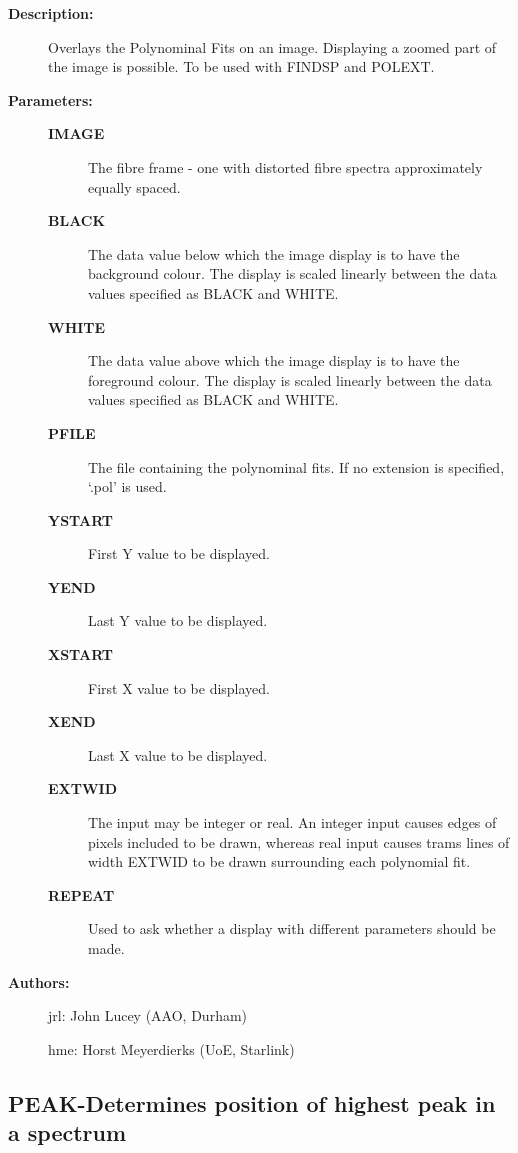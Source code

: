\begin{description}
\begin{description}
\item [\textbf{Description:}]
 Overlays the Polynominal Fits on  an image.
 Displaying a zoomed part of the image is possible.
 To be used with FINDSP and POLEXT.

\item [\textbf{Parameters:}]
\begin{description}
\item [\textbf{IMAGE}]
 The fibre frame - one with distorted fibre spectra
 approximately equally spaced.
\item [\textbf{BLACK}]
 The data value below which the image display is to have the
 background colour. The display is scaled linearly between the
 data values specified as BLACK and WHITE.
\item [\textbf{WHITE}]
 The data value above which the image display is to have the
 foreground colour. The display is scaled linearly between the
 data values specified as BLACK and WHITE.
\item [\textbf{PFILE}]
 The file containing the polynominal fits. If no extension is
 specified, `.pol' is used.
\item [\textbf{YSTART}]
 First Y value to be displayed.
\item [\textbf{YEND}]
 Last Y value to be displayed.
\item [\textbf{XSTART}]
 First X value to be displayed.
\item [\textbf{XEND}]
 Last X value to be displayed.
\item [\textbf{EXTWID}]
 The input may be integer or real. An integer input causes edges
 of pixels included to be drawn, whereas real input causes trams
 lines of width EXTWID to be drawn surrounding each polynomial
 fit.
\item [\textbf{REPEAT}]
 Used to ask whether a display with different parameters should
 be made.
\end{description}

\item [\textbf{Authors:}]
 jrl: John Lucey (AAO, Durham)

 hme: Horst Meyerdierks (UoE, Starlink)
\end{description}
\subsection{PEAK-\label{PEAK}Determines position of highest peak in a spectrum}
\begin{description}


\end{description}
\end{description}
